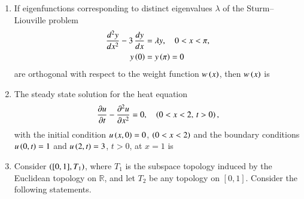 \documentclass[journal,12pt,onecolumn]{IEEEtran}
\theoremstyle{remark}
\begin{document}
\begin{enumerate}
\hfill{}

\begin{enumerate}
\end{enumerate}

\item If eigenfunctions corresponding to distinct eigenvalues $\lambda$ of the Sturm--Liouville problem
\begin{align*}
\frac{d^{2}y}{dx^{2}} - 3\,\frac{dy}{dx} &= \lambda y,\quad 0 < x < \pi,\\
y\left(0\right) &= y\left(\pi\right) = 0
\end{align*}
are orthogonal with respect to the weight function $w\left(x\right)$, then $w\left(x\right)$ is

\hfill{}

\begin{enumerate}
\end{enumerate}

\item The steady state solution for the heat equation
\begin{align*}
\frac{\partial u}{\partial t} - \frac{\partial^{2} u}{\partial x^{2}} = 0,\quad \left(0 < x < 2,\, t > 0\right),
\end{align*}
with the initial condition $u\left(x,0\right)=0$, $\left(0 < x < 2\right)$ and the boundary conditions $u\left(0,t\right)=1$ and $u\left(2,t\right)=3$, $t>0$, at $x=1$ is

\hfill{}

\begin{enumerate}
\end{enumerate}
\newpage
\item Consider $\left([0,1], T_{1}\right)$, where $T_{1}$ is the subspace topology induced by the Euclidean topology on $\mathbb{R}$, and let $T_{2}$ be any topology on $[0,1]$. Consider the following statements.


\end{enumerate}
\end{document}
